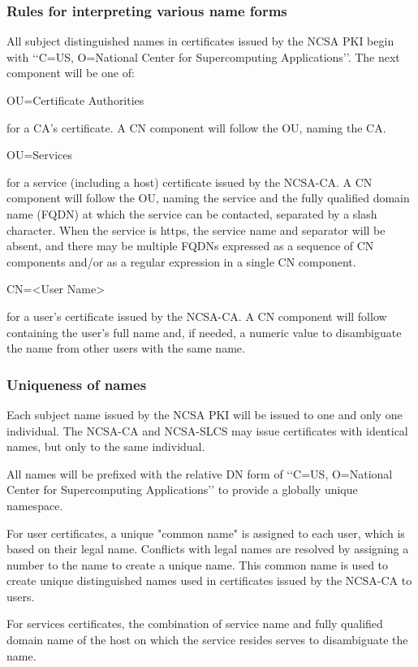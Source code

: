 \documentclass[10pt]{article}
\begin{document}
\subsubsection{Rules for interpreting various name forms}

All subject distinguished names in certificates issued by the NCSA PKI
begin with ‘‘C=US, O=National Center for Supercomputing
Applications’’. The next component will be one of:

OU=Certificate Authorities 

for a CA’s certificate. A CN component will follow the OU, naming the
CA.

OU=Services 

for a service (including a host) certificate issued by the NCSA-CA. A
CN component will follow the OU, naming the service and the fully
qualified domain name (FQDN) at which the service can be contacted,
separated by a slash character. When the service is https, the service
name and separator will be absent, and there may be multiple FQDNs
expressed as a sequence of CN components and/or as a regular
expression in a single CN component.

CN=<User Name>

for a user’s certificate issued by the NCSA-CA. A CN component will
follow containing the user’s full name and, if needed, a numeric value
to disambiguate the name from other users with the same name.

\subsubsection{Uniqueness of names}

Each subject name issued by the NCSA PKI will be issued to one and
only one individual. The NCSA-CA and NCSA-SLCS may issue certificates
with identical names, but only to the same individual.

All names will be prefixed with the relative DN form of ‘‘C=US,
O=National Center for Supercomputing Applications’’ to provide a
globally unique namespace.

For user certificates, a unique "common name" is assigned to each
user, which is based on their legal name. Conflicts with legal names
are resolved by assigning a number to the name to create a unique
name. This common name is used to create unique distinguished names
used in certificates issued by the NCSA-CA to users.

For services certificates, the combination of service name and fully
qualified domain name of the host on which the service resides serves
to disambiguate the name.
\end{document}
